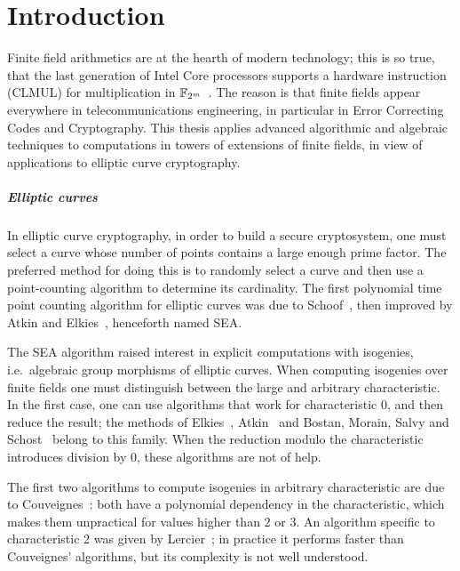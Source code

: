 \chapter[Intoduction (English)][Introduction]{Introduction}

Finite field arithmetics are at the hearth of modern technology; this
is so true, that the last generation of Intel Core processors supports
a hardware instruction (CLMUL) for multiplication in
$\mathbb{F}_{2^m}$~\cite{intel-carryless}. The reason is that finite fields
appear everywhere in telecommunications engineering, in particular in
Error Correcting Codes and Cryptography. This thesis applies advanced
algorithmic and algebraic techniques to computations in towers of
extensions of finite fields, in view of applications to elliptic curve
cryptography.


\paragraph*{Elliptic curves}
In elliptic curve cryptography, in order to build a secure
cryptosystem, one must select a curve whose number of points contains
a large enough prime factor. The preferred method for doing this is to
randomly select a curve and then use a point-counting algorithm to
determine its cardinality. The first polynomial time point counting
algorithm for elliptic curves was due to Schoof~\cite{schoof85}, then
improved by Atkin and Elkies~\cite{atkin88,elkies98,schoof95},
henceforth named SEA.

The SEA algorithm raised interest in explicit computations with
isogenies, i.e.\ algebraic group morphisms of elliptic curves. When
computing isogenies over finite fields one must distinguish between
the large and arbitrary characteristic. In the first case, one can use
algorithms that work for characteristic $0$, and then reduce the
result; the methods of Elkies~\cite{elkies98,morain95},
Atkin~\cite{schoof95} and Bostan, Morain, Salvy and
Schost~\cite{bostan+morain+salvy+schost08} belong to this family. When
the reduction modulo the characteristic introduces division by $0$,
these algorithms are not of help.

The first two algorithms to compute isogenies in arbitrary
characteristic are due to Couveignes~\cite{couveignes94,couveignes96}:
both have a polynomial dependency in the characteristic, which makes
them unpractical for values higher than $2$ or $3$. An algorithm
specific to characteristic $2$ was given by Lercier~\cite{lercier96};
in practice it performs faster than Couveignes' algorithms, but its
complexity is not well understood. 

